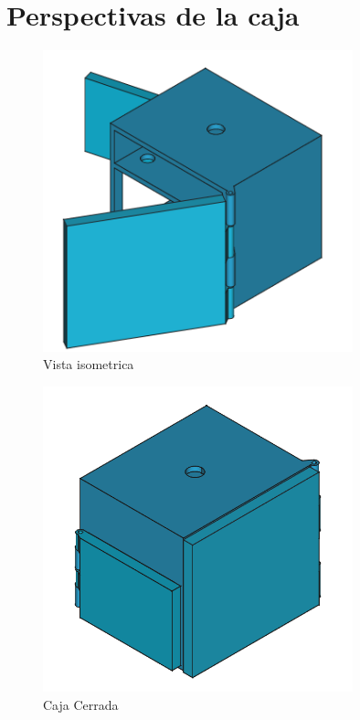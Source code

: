 \section{Perspectivas de la caja}

\begin{figure}[H]
	\centering
	\includegraphics[width=0.8\textwidth]{images/4-DesarrolloTeorico/4-1-caja/CAJA_3D_ISOMETRICA_2.png}
	\caption{Vista isometrica}
\end{figure}

\begin{figure}[H]
	\centering
	\includegraphics[width=0.8\textwidth]{images/4-DesarrolloTeorico/4-1-caja/CAJA_3D_CERRADA.png}
	\caption{Caja Cerrada}
\end{figure}

